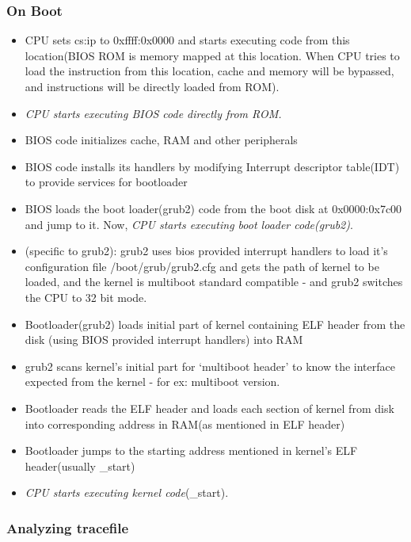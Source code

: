 \documentclass[]{book}
\begin{document}
\subsubsection*{On Boot}\label{on-boot}

\begin{itemize}
\itemsep1pt\parskip0pt
\item
  CPU sets cs:ip to 0xffff:0x0000 and starts executing code from this
  location(BIOS ROM is memory mapped at this location. When CPU tries to
  load the instruction from this location, cache and memory will be
  bypassed, and instructions will be directly loaded from ROM).
\item
  \emph{CPU starts executing BIOS code directly from ROM.}
\item
  BIOS code initializes cache, RAM and other peripherals
\item
  BIOS code installs its handlers by modifying Interrupt descriptor
  table(IDT) to provide services for bootloader
\item
  BIOS loads the boot loader(grub2) code from the boot disk at
  0x0000:0x7c00 and jump to it. Now, \emph{CPU starts executing boot
  loader code(grub2)}.
\item
  (specific to grub2): grub2 uses bios provided interrupt handlers to
  load it's configuration file /boot/grub/grub2.cfg and gets the path of
  kernel to be loaded, and the kernel is multiboot standard compatible -
  and grub2 switches the CPU to 32 bit mode.
\item
  Bootloader(grub2) loads initial part of kernel containing ELF header
  from the disk (using BIOS provided interrupt handlers) into RAM
\item
  grub2 scans kernel's initial part for `multiboot header' to know the
  interface expected from the kernel - for ex: multiboot version.
\item
  Bootloader reads the ELF header and loads each section of kernel from
  disk into corresponding address in RAM(as mentioned in ELF header)
\item
  Bootloader jumps to the starting address mentioned in kernel's ELF
  header(usually \_start)
\item
  \emph{CPU starts executing kernel code}(\_start).
\end{itemize}

\subsubsection*{Analyzing tracefile}\label{analyzing-tracefile}
\end{document}
